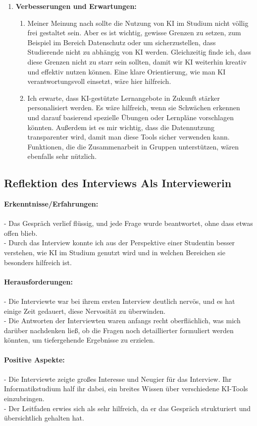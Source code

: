 \documentclass[a4paper,12pt]{article}
\begin{document}
\begin{enumerate}[label=\arabic*.)]
    \item \textbf{Verbesserungen und Erwartungen:}
    \begin{enumerate}[label=\roman*)]
        \item Meiner Meinung nach sollte die Nutzung von KI im Studium nicht völlig frei
        gestaltet sein. Aber es ist wichtig, gewisse Grenzen zu setzen, zum
        Beispiel im Bereich Datenschutz oder um sicherzustellen, dass
        Studierende nicht zu abhängig von KI werden. Gleichzeitig finde ich, dass
        diese Grenzen nicht zu starr sein sollten, damit wir KI weiterhin kreativ und
        effektiv nutzen können. Eine klare Orientierung, wie man KI
        verantwortungsvoll einsetzt, wäre hier hilfreich.

        \item Ich erwarte, dass KI-gestützte Lernangebote in Zukunft stärker
        personalisiert werden. Es wäre hilfreich, wenn sie Schwächen erkennen
        und darauf basierend spezielle Übungen oder Lernpläne vorschlagen
        könnten. Außerdem ist es mir wichtig, dass die Datennutzung
        transparenter wird, damit man diese Tools sicher verwenden kann.
        Funktionen, die die Zusammenarbeit in Gruppen unterstützen, wären
        ebenfalls sehr nützlich.
    \end{enumerate}
\end{enumerate}

\newpage
\subsection*{Reflektion des Interviews Als Interviewerin}
\textbf{Erkenntnisse/Erfahrungen:} \\\\
- Das Gespräch verlief flüssig, und jede Frage wurde beantwortet, ohne dass etwas offen blieb. \\
- Durch das Interview konnte ich aus der Perspektive einer Studentin besser verstehen, wie KI im Studium genutzt wird und in welchen Bereichen sie besonders hilfreich ist.\\\\
\textbf{Herausforderungen:}\\\\
- Die Interviewte war bei ihrem ersten Interview deutlich nervös, und es hat einige Zeit gedauert, diese Nervosität zu überwinden.\\
- Die Antworten der Interviewten waren anfangs recht oberflächlich, was mich darüber nachdenken ließ, ob die Fragen noch detaillierter formuliert werden könnten, um tiefergehende Ergebnisse zu erzielen.\\\\
\textbf{Positive Aspekte:}\\\\
- Die Interviewte zeigte großes Interesse und Neugier für das Interview. Ihr Informatikstudium half ihr dabei, ein breites Wissen über verschiedene KI-Tools einzubringen.\\
- Der Leitfaden erwies sich als sehr hilfreich, da er das Gespräch strukturiert und übersichtlich gehalten hat.
\end{document}
